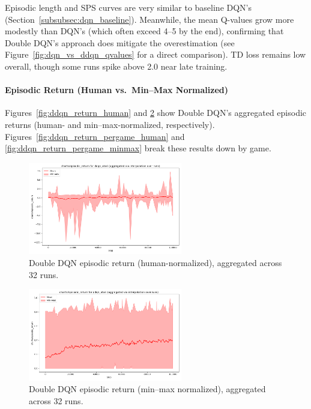 Episodic length and SPS curves are very similar to baseline DQN's (Section~\ref{subsubsec:dqn_baseline}). 
Meanwhile, the mean Q-values grow more modestly than DQN's (which often exceed 4--5 by the end), confirming 
that Double DQN's approach does mitigate the overestimation (see Figure~\vref{fig:dqn_vs_ddqn_qvalues} for a direct comparison).
TD loss remains low overall, though some runs spike above 2.0 near late training.

\paragraph{Episodic Return (Human vs.\ Min--Max Normalized)}
Figures~\vref{fig:ddqn_return_human} and \ref{fig:ddqn_return_minmax} show Double DQN's aggregated episodic returns (human- and min--max-normalized, respectively). 
Figures~\ref{fig:ddqn_return_pergame_human} and \ref{fig:ddqn_return_pergame_minmax} break these results down by game.

\begin{figure}
	\centering
	\includegraphics[width=0.6\textwidth]{figures/ddqn/charts_episodic_return_human_ddqn_atari.png}
	\caption{Double DQN episodic return (human-normalized), aggregated across 32 runs.}
	\label{fig:ddqn_return_human}
\end{figure}

\begin{figure}
	\centering
	\includegraphics[width=0.6\textwidth]{figures/ddqn/charts_episodic_return_minmax_ddqn_atari.png}
	\caption{Double DQN episodic return (min--max normalized), aggregated across 32 runs.}
	\label{fig:ddqn_return_minmax}
\end{figure}

